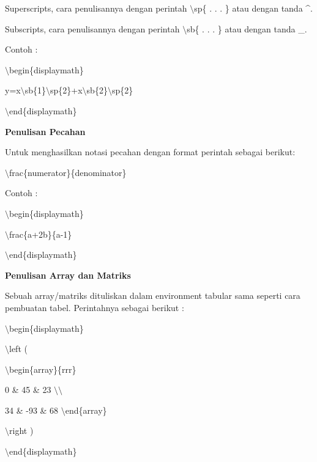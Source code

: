 Superscripts, cara penulisannya dengan perintah $\setminus$sp\{ . . . 
\} atau dengan tanda \^{}.
\par \vspace{12pt}
Subscripts, cara penulisannya dengan perintah $\setminus$sb\{ . . . \} 
atau dengan tanda \_.
\par \vspace{12pt}
Contoh :
\par \vspace{12pt}
$\setminus$begin\{displaymath\}
\par \vspace{12pt}

y=x$\setminus$sb\{1\}$\setminus$sp\{2\}+x$\setminus$sb\{2\}$\setminus$sp\{2\}
\par \vspace{12pt}
$\setminus$end\{displaymath\}
\par \vspace{12pt}


\textbf{Penulisan Pecahan}
\par \vspace{12pt}
Untuk menghasilkan notasi pecahan dengan format perintah sebagai berikut:\par \vspace{12pt}

$\setminus$frac\{numerator\}\{denominator\}
\par \vspace{12pt}
Contoh :
\par \vspace{12pt}
$\setminus$begin\{displaymath\}
\par \vspace{12pt}
$\setminus$frac\{a+2b\}\{a-1\}
\par \vspace{12pt}
$\setminus$end\{displaymath\}
\par \vspace{12pt}


\textbf{Penulisan Array dan Matriks}
\par \vspace{12pt}
Sebuah array/matriks dituliskan dalam environment tabular sama seperti cara pembuatan tabel. Perintahnya sebagai berikut :
\par \vspace{12pt}
$\setminus$begin\{displaymath\}
\par \vspace{12pt}
$\setminus$left (
\par \vspace{12pt}
$\setminus$begin\{array\}\{rrr\}
\par \vspace{12pt}
0 \& 45 \& 23 $\setminus$$\setminus$
\par \vspace{12pt}
34 \& -93 \& 68 $\setminus$end\{array\}
\par \vspace{12pt}
$\setminus$right )
\par \vspace{12pt}
$\setminus$end\{displaymath\}
\par \vspace{12pt}


